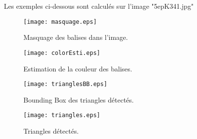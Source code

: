 \documentclass{article}
\begin{document}
Les exemples ci-dessous sont calculés sur l'image "5epK341.jpg"
\begin{figure}[h!]
    \centering
    \begin{minipage}{0.45\textwidth}
        \centering
        \texttt{[image: masquage.eps]}
        \caption{Masquage des balises dans l'image.}
        \label{tab:mask-result}
    \end{minipage}\hfill
    \begin{minipage}{0.45\textwidth}
        \centering
        \texttt{[image: colorEsti.eps]}
        \caption{Estimation de la couleur des balises.}
        \label{tab:color-estimation}
    \end{minipage}

\end{figure}
\begin{figure}[h!]
    \centering\begin{minipage}{0.45\textwidth}
        \centering
        \texttt{[image: trianglesBB.eps]}
        \caption{Bounding Box des triangles détectés.}
        \label{tab:triangles-bb}
    \end{minipage}
    \begin{minipage}{0.45\textwidth}
        \centering
        \texttt{[image: triangles.eps]}
        \caption{Triangles détectés.}
        \label{tab:triangles}
    \end{minipage}\hfill

\end{figure}
\end{document}
